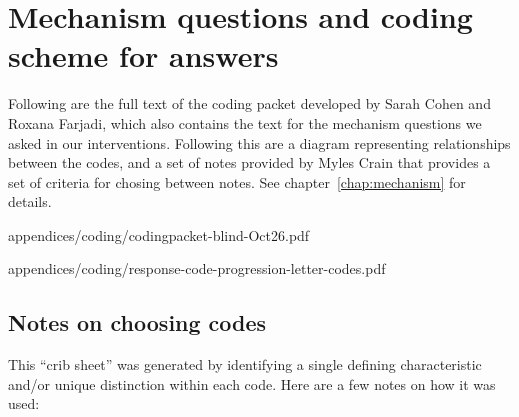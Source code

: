 \chapter{Mechanism questions and coding scheme for answers}

Following are the full text of the coding packet developed by Sarah Cohen and
Roxana Farjadi, which also contains the text for the mechanism questions we
asked in our interventions. Following this are a diagram representing
relationships between the codes, and a set of notes provided by Myles Crain that
provides a set of criteria for chosing between notes. See
chapter~\ref{chap:mechanism} for details.

           {appendices/coding/codingpacket-blind-Oct26.pdf}


           {appendices/coding/response-code-progression-letter-codes.pdf}



\section{Notes on choosing codes}

This “crib sheet” was generated by identifying a single defining characteristic
and/or unique distinction within each code. Here are a few notes on how it was
used:


